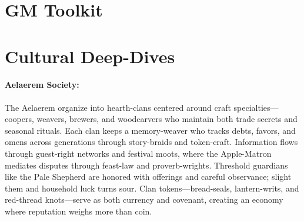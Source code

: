 \documentclass[11pt,letterpaper]{article}
\begin{document}
\section{GM Toolkit}

\section{Cultural Deep-Dives}

\paragraph*{Aelaerem Society:}
The Aelaerem organize into hearth-clans centered around craft specialties---coopers, weavers, brewers, and woodcarvers who maintain both trade secrets and seasonal rituals. Each clan keeps a memory-weaver who tracks debts, favors, and omens across generations through story-braids and token-craft. Information flows through guest-right networks and festival moots, where the Apple-Matron mediates disputes through feast-law and proverb-wrights. Threshold guardians like the Pale Shepherd are honored with offerings and careful observance; slight them and household luck turns sour. Clan tokens---bread-seals, lantern-writs, and red-thread knots---serve as both currency and covenant, creating an economy where reputation weighs more than coin.
\end{document}
